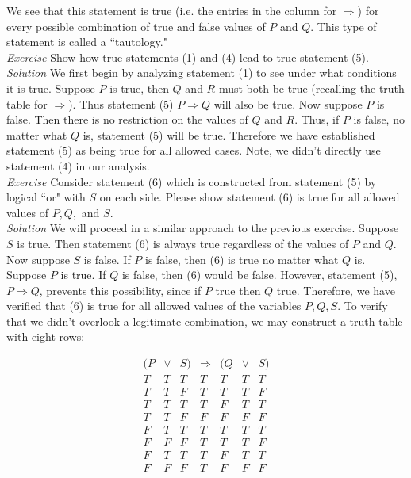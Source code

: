 We see that this statement is true (i.e. the entries in the column for $\Longrightarrow$) for every possible combination of true and false values of $P$ and $Q$.  This type of statement is called a ``tautology."\\


\textit{Exercise} Show how true statements (1) and (4) lead to true statement (5).\\

\textit{Solution} We first begin by analyzing statement (1) to see under what conditions it is true.  Suppose $P$ is true, then $Q$ and $R$ must both be true (recalling the truth table for $\Longrightarrow$).  Thus statement (5) $P \Longrightarrow Q$ will also be true.  Now suppose $P$ is false.  Then there is no restriction on the values of $Q$ and $R$.  Thus, if $P$ is false, no matter what $Q$ is, statement (5) will be true.  Therefore we have established statement (5) as being true for all allowed cases.  Note, we didn't directly use statement (4) in our analysis.\\

\textit{Exercise} Consider statement (6) which is constructed from statement (5) by logical ``or" with $S$ on each side.  Please show statement (6) is true for all allowed values of $P,Q,$ and $S$.\\

\textit{Solution} We will proceed in a similar approach to the previous exercise.  Suppose $S$ is true.  Then statement (6) is always true regardless of the values of $P$ and $Q$.  Now suppose $S$ is false.  If $P$ is false, then (6) is true no matter what $Q$ is.  Suppose $P$ is true.  If $Q$ is false, then (6) would be false.  However, statement (5), $P \Longrightarrow Q$, prevents this possibility, since if $P$ true then $Q$ true.  Therefore, we have verified that (6) is true for all allowed values of the variables $P, Q, S$.  To verify that we didn't overlook a legitimate combination, we may construct a truth table with eight rows:

\begin{displaymath}
\begin{array}{|c|c|c|c|c|c|c|}
 (P& \lor& S) &\Longrightarrow & (Q & \lor & S)  \\
\hline
T & T & T & T & T & T & T \\
T & T & F & T & T & T & F \\
T & T & T & T & F & T & T \\
T & T & F & F & F & F & F \\
F & T & T & T & T & T & T \\
F & F & F & T & T & T & F \\
F & T & T & T & F & T & T \\
F & F & F & T & F & F & F \\
\end{array}
\end{displaymath}

